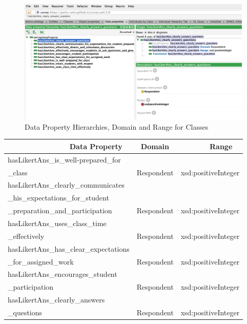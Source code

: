 \begin{doublespace}
\begin{figure}[htp]
    \centering
    \includegraphics[width=15cm]{images/ch4/Figure14.png}
    \caption{Data Property Hierarchies, Domain and Range for Classes}
    \label{fig:4.14}
\end{figure}
\begin{table}[h!]
    \centering
    \begin{tabular}{|l|l|l|} 
    \hline \ \ \ \ \ \ \ \ \ \ \ \ \ \ \ Data Property &\ Domain &\ \ \ \ \ \ \ Range\\ \hline
     hasLikertAns\_is\_well-prepared\_for&\\ \_class & \multirow{-2}{5em}{Respondent} & \multirow{-2}{8.5em}{xsd:positiveInteger}\\ \hline
     hasLikertAns\_clearly\_communicates&\\ \_his\_expectations\_for\_student&\\ \_preparation\_and\_participation & \multirow{-3}{5em}{Respondent} & \multirow{-3}{8.5em}{xsd:positiveInteger}\\ \hline
     hasLikertAns\_uses\_class\_time&\\ \_effectively & \multirow{-2}{5em}{Respondent} & \multirow{-2}{8.5em}{xsd:positiveInteger}\\ \hline
     hasLikertAns\_has\_clear\_expectations&\\ \_for\_assigned\_work & \multirow{-2}{5em}{Respondent} & \multirow{-2}{8.5em}{xsd:positiveInteger}\\ \hline
     hasLikertAns\_encourages\_student&\\ \_participation & \multirow{-2}{5em}{Respondent} & \multirow{-2}{8.5em}{xsd:positiveInteger}\\ \hline
     hasLikertAns\_clearly\_answers&\\ \_questions & \multirow{-2}{5em}{Respondent} & \multirow{-2}{8.5em}{xsd:positiveInteger}\\ \hline

\end{tabular}
\end{table}
\end{doublespace}
